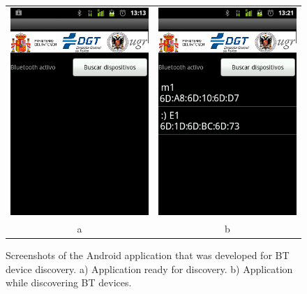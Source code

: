 \documentclass{llncs}
\begin{document}
\begin{figure}[htpb] 
\begin{center} 
\begin{tabular}{cc}
\includegraphics[scale=0.3]{CAP1.png}  &
\includegraphics[scale=0.3]{CAP2.png}  \\
a & b 
\end{tabular}
\end{center} 
\caption{Screenshots of the Android application that was developed for BT device discovery. a) Application ready for discovery. b) Application while discovering BT devices.} 
\label{apk} 
\end{figure}
\end{document}
